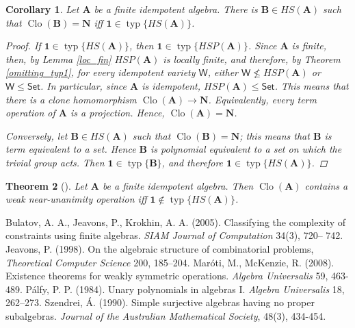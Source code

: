 \documentclass{amsart}
\theoremstyle{plain}
\newtheorem{theorem}{Theorem}[section]
\newtheorem{corollary}[theorem]{Corollary}
\theoremstyle{definition}
\theoremstyle{remark}
\DeclareMathOperator{\Clo}{Clo}
\DeclareMathOperator{\typ}{typ}
\DeclareMathOperator{\fin}{fin}
\begin{document}
\begin{corollary}
    Let $\mathbf{A}$ be a finite idempotent algebra. 
    There is $\mathbf{B} \in HS(\mathbf{A})$ such that $\Clo(\mathbf{B})=\mathbf{N}$ iff $\mathbf{1} \in \typ\{HS(\mathbf{A})\}$. 
    \begin{proof}
        If $\mathbf{1} \in \typ\{HS(\mathbf{A})\}$, then $\mathbf{1} \in \typ\{HSP(\mathbf{A})\}$. 
        Since $\mathbf{A}$ is finite, then, by Lemma \ref{loc_fin} $HSP(\mathbf{A})$ is locally finite, 
        and therefore, by Theorem \ref{omitting_typ1}, for every idempotent variety $\mathsf{W}$, either $\mathsf{W} \nleq HSP(\mathbf{A})$ or $\mathsf{W} \le \mathsf{Set}$. 
        In particular, since $\mathbf{A}$ is idempotent, $HSP(\mathbf{A}) \le \mathsf{Set}$. 
        This means that there is a clone homomorphism $\Clo(\mathbf{A}) \to \mathbf{N}$. 
        Equivalently, every term operation of $\mathbf{A}$ is a projection. 
        Hence, $\Clo(\mathbf{A}) = \mathbf{N}$. 

        Conversely, let $\mathbf{B} \in HS(\mathbf{A})$ such that $\Clo(\mathbf{B})=\mathbf{N}$; 
        this means that $\mathbf{B}$ is term equivalent to a set. 
        Hence $\mathbf{B}$ is polynomial equivalent to a set on which the trivial group acts. 
        Then $\mathbf{1} \in \typ\{\mathbf{B}\}$, and therefore $\mathbf{1} \in \typ\{HS(\mathbf{A})\}$. 
    \end{proof}
\end{corollary}

\begin{comment}
\begin{corollary}
    Let $\mathbf{A}$ be a finite idempotent algebra. 
    Then $\mathbf{1} \in \typ\{HS(\mathbf{A})\}$ iff $HSP_{\fin}(\mathbf{A})$ contains a set. 
\end{corollary}
\end{comment}

\begin{theorem}
    [\cite{wnu}]
    Let $\mathbf{A}$ be a finite idempotent algebra. 
    Then $\Clo(\mathbf{A})$ contains a weak near-unanimity operation iff $\mathbf{1} \notin \typ\{HS(\mathbf{A})\}$. 
\end{theorem}

\begin{thebibliography}{9}
    Bulatov, A. A.,  Jeavons, P., Krokhin, A. A. (2005). Classifying the complexity of constraints using finite algebras. \emph{SIAM Journal of Computation} 34(3), 720– 742.
    Jeavons, P. (1998). On the algebraic structure of combinatorial problems, \emph{Theoretical Computer Science} 200, 185–204.
    Mar\'oti, M., McKenzie, R. (2008). Existence theorems for weakly symmetric operations. \emph{Algebra Universalis} 59, 463-489.
    P\'alfy, P. P. (1984). Unary polynomials in algebras I. \emph{Algebra Universalis} 18, 262–273.
    Szendrei, Á. (1990). Simple surjective algebras having no proper subalgebras. \emph{Journal of the Australian Mathematical Society}, 48(3), 434-454. 
 \end{thebibliography}
\end{document}
